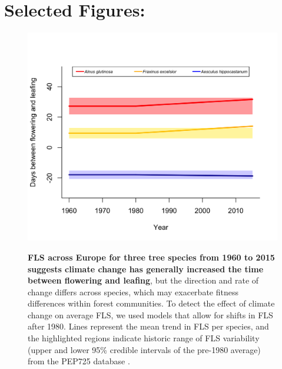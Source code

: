 \documentclass[11pt,a4paper]{article}
\begin{document}
\section*{Selected Figures:}
   \begin{figure}[ht!]
   \centering
 \includegraphics[width=.9\textwidth]{..//figure/FLS_climate_change.png}\\
\caption{\textbf{FLS across Europe for three tree species from 1960 to 2015 suggests climate change has generally increased the time between flowering and leafing}, but the direction and rate of change differs across species, which may exacerbate fitness differences within forest communities. To detect the effect of climate change on average FLS, we used models that allow for shifts in FLS after 1980. Lines represent the mean trend in FLS per species, and the highlighted regions indicate historic range of FLS variability (upper and lower 95\% credible intervals of the pre-1980 average) from the PEP725 database \citep{PEP725}.}
    \label{fig:Figure 1}
    \end{figure}
\newpage

\end{document}
